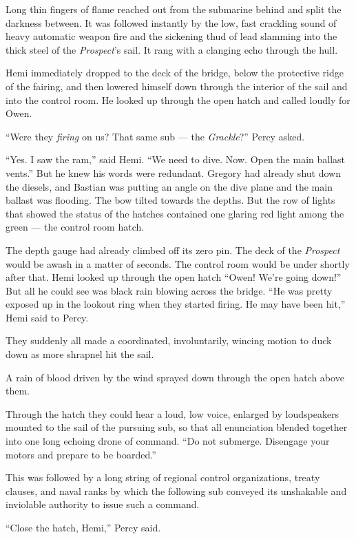 \documentclass[
]{scrbook}
\begin{document}
Long thin fingers of flame reached out from the submarine behind and
split the darkness between. It was followed instantly by the low, fast
crackling sound of heavy automatic weapon fire and the sickening thud of
lead slamming into the thick steel of the \emph{Prospect}'s sail. It
rang with a clanging echo through the hull.

Hemi immediately dropped to the deck of the bridge, below the protective
ridge of the fairing, and then lowered himself down through the interior
of the sail and into the control room. He looked up through the open
hatch and called loudly for Owen.

``Were they \emph{firing} on us? That same sub --- the \emph{Grackle}?''
Percy asked.

``Yes. I saw the ram,'' said Hemi. ``We need to dive. Now. Open the main
ballast vents.'' But he knew his words were redundant. Gregory had
already shut down the diesels, and Bastian was putting an angle on the
dive plane and the main ballast was flooding. The bow tilted towards the
depths. But the row of lights that showed the status of the hatches
contained one glaring red light among the green --- the control room
hatch.

The depth gauge had already climbed off its zero pin. The deck of the
\emph{Prospect} would be awash in a matter of seconds. The control room
would be under shortly after that. Hemi looked up through the open hatch
``Owen! We're going down!'' But all he could see was black rain blowing
across the bridge. ``He was pretty exposed up in the lookout ring when
they started firing. He may have been hit,'' Hemi said to Percy.

They suddenly all made a coordinated, involuntarily, wincing motion to
duck down as more shrapnel hit the sail.

A rain of blood driven by the wind sprayed down through the open hatch
above them.

Through the hatch they could hear a loud, low voice, enlarged by
loudspeakers mounted to the sail of the pursuing sub, so that all
enunciation blended together into one long echoing drone of command.
``Do not submerge. Disengage your motors and prepare to be boarded.''

This was followed by a long string of regional control organizations,
treaty clauses, and naval ranks by which the following sub conveyed its
unshakable and inviolable authority to issue such a command.

``Close the hatch, Hemi,'' Percy said.
\end{document}
